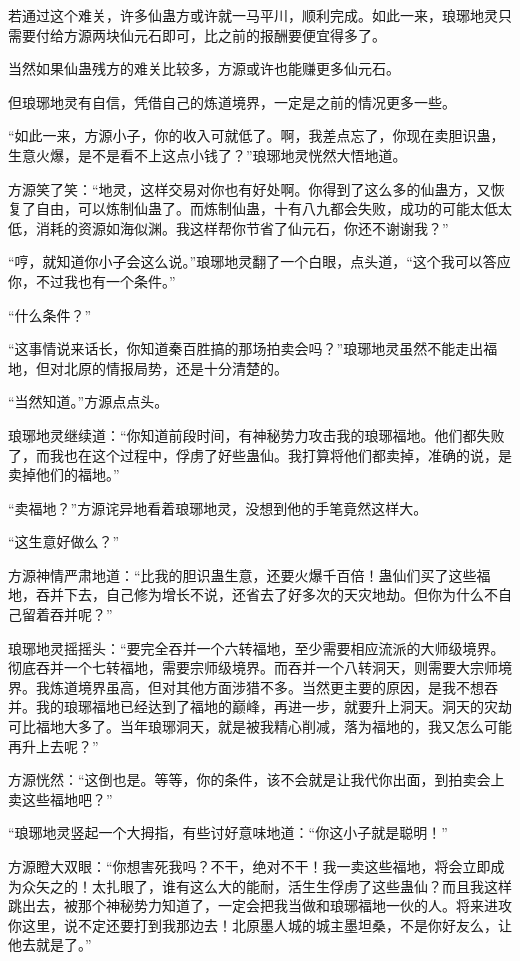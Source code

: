 \begin{this_body}
若通过这个难关，许多仙蛊方或许就一马平川，顺利完成。如此一来，琅琊地灵只需要付给方源两块仙元石即可，比之前的报酬要便宜得多了。

当然如果仙蛊残方的难关比较多，方源或许也能赚更多仙元石。

但琅琊地灵有自信，凭借自己的炼道境界，一定是之前的情况更多一些。

“如此一来，方源小子，你的收入可就低了。啊，我差点忘了，你现在卖胆识蛊，生意火爆，是不是看不上这点小钱了？”琅琊地灵恍然大悟地道。

方源笑了笑：“地灵，这样交易对你也有好处啊。你得到了这么多的仙蛊方，又恢复了自由，可以炼制仙蛊了。而炼制仙蛊，十有八九都会失败，成功的可能太低太低，消耗的资源如海似渊。我这样帮你节省了仙元石，你还不谢谢我？”

“哼，就知道你小子会这么说。”琅琊地灵翻了一个白眼，点头道，“这个我可以答应你，不过我也有一个条件。”

“什么条件？”

“这事情说来话长，你知道秦百胜搞的那场拍卖会吗？”琅琊地灵虽然不能走出福地，但对北原的情报局势，还是十分清楚的。

“当然知道。”方源点点头。

琅琊地灵继续道：“你知道前段时间，有神秘势力攻击我的琅琊福地。他们都失败了，而我也在这个过程中，俘虏了好些蛊仙。我打算将他们都卖掉，准确的说，是卖掉他们的福地。”

“卖福地？”方源诧异地看着琅琊地灵，没想到他的手笔竟然这样大。

“这生意好做么？”

方源神情严肃地道：“比我的胆识蛊生意，还要火爆千百倍！蛊仙们买了这些福地，吞并下去，自己修为增长不说，还省去了好多次的天灾地劫。但你为什么不自己留着吞并呢？”

琅琊地灵摇摇头：“要完全吞并一个六转福地，至少需要相应流派的大师级境界。彻底吞并一个七转福地，需要宗师级境界。而吞并一个八转洞天，则需要大宗师境界。我炼道境界虽高，但对其他方面涉猎不多。当然更主要的原因，是我不想吞并。我的琅琊福地已经达到了福地的巅峰，再进一步，就要升上洞天。洞天的灾劫可比福地大多了。当年琅琊洞天，就是被我精心削减，落为福地的，我又怎么可能再升上去呢？”

方源恍然：“这倒也是。等等，你的条件，该不会就是让我代你出面，到拍卖会上卖这些福地吧？”

“琅琊地灵竖起一个大拇指，有些讨好意味地道：“你这小子就是聪明！”

方源瞪大双眼：“你想害死我吗？不干，绝对不干！我一卖这些福地，将会立即成为众矢之的！太扎眼了，谁有这么大的能耐，活生生俘虏了这些蛊仙？而且我这样跳出去，被那个神秘势力知道了，一定会把我当做和琅琊福地一伙的人。将来进攻你这里，说不定还要打到我那边去！北原墨人城的城主墨坦桑，不是你好友么，让他去就是了。”


\end{this_body}
